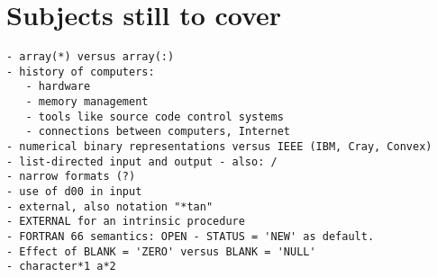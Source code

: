 \documentclass{article}
\begin{document}
\section{Subjects still to cover}
\begin{verbatim}
- array(*) versus array(:)
- history of computers:
   - hardware
   - memory management
   - tools like source code control systems
   - connections between computers, Internet
- numerical binary representations versus IEEE (IBM, Cray, Convex)
- list-directed input and output - also: /
- narrow formats (?)
- use of d00 in input
- external, also notation "*tan"
- EXTERNAL for an intrinsic procedure
- FORTRAN 66 semantics: OPEN - STATUS = 'NEW' as default.
- Effect of BLANK = 'ZERO' versus BLANK = 'NULL'
- character*1 a*2
\end{verbatim}

%
%
%
%
%
%



\end{document}
